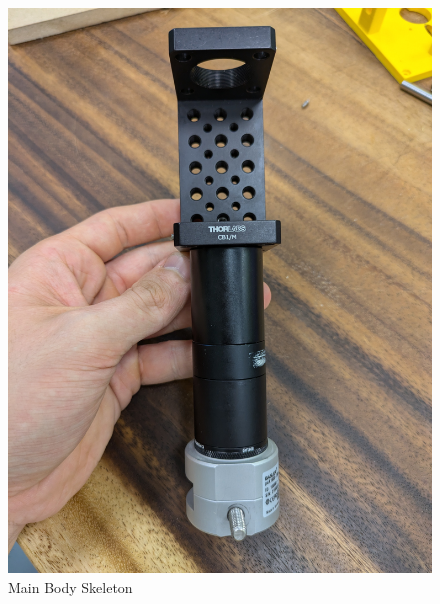 \documentclass[runningheads]{llncs}
\begin{document}
\begin{figure}
    \centering
    \begin{minipage}[b]{0.4\textwidth}
        \includegraphics[width=\linewidth]{images/cage&cam.jpg}
        \caption{Main Body Skeleton}
        \label{fig:cage&camera}
    \end{minipage}
    \hfill
    \begin{minipage}[b]{0.4\textwidth}
        \centering

\end{minipage}
\end{figure}
\end{document}
